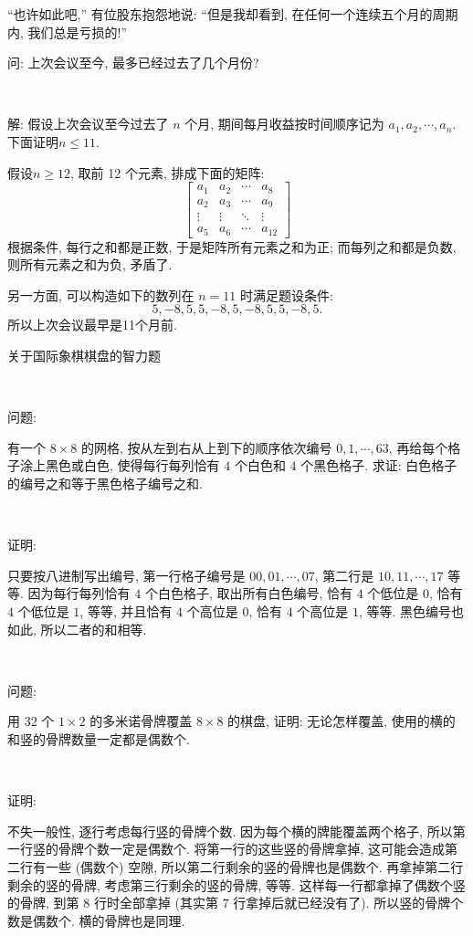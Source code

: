 ``也许如此吧,'' 有位股东抱怨地说: ``但是我却看到, 在任何一个连续五个月的周期内, 我们总是亏损的!''

问: 上次会议至今, 最多已经过去了几个月份?

~

解: 假设上次会议至今过去了 $n$ 个月, 期间每月收益按时间顺序记为 $a_1, a_2, \cdots, a_n$. 下面证明$n \le 11$.

假设$n\ge 12$, 取前 12 个元素, 排成下面的矩阵:
\[
\begin{bmatrix}
a_1 & a_2 & \cdots & a_8 \\
a_2 & a_3 & \cdots & a_9 \\
\vdots & \vdots & \ddots & \vdots \\
a_5 & a_6 & \cdots & a_{12}
\end{bmatrix}
\]
根据条件, 每行之和都是正数, 于是矩阵所有元素之和为正; 而每列之和都是负数, 则所有元素之和为负, 矛盾了.

另一方面, 可以构造如下的数列在 $n = 11$ 时满足题设条件: 
\[ 5, -8, 5, 5, -8, 5, -8, 5, 5, -8, 5 .\]
所以上次会议最早是11个月前.

\newpage
\noindent 关于国际象棋棋盘的智力题

~

\noindent 问题:

有一个 $ 8\times 8$ 的网格, 按从左到右从上到下的顺序依次编号 $0, 1, \cdots, 63 $, 再给每个格子涂上黑色或白色, 使得每行每列恰有 $ 4 $ 个白色和 $ 4 $ 个黑色格子. 求证: 白色格子的编号之和等于黑色格子编号之和.

~

\noindent 证明:

只要按八进制写出编号, 第一行格子编号是 $00, 01, \cdots, 07 $, 第二行是 $ 10, 11, \cdots, 17 $ 等等.
因为每行每列恰有 $ 4 $ 个白色格子, 取出所有白色编号, 恰有 $ 4 $ 个低位是 $ 0 $, 恰有 $ 4 $ 个低位是 $ 1 $, 等等, 并且恰有 $ 4 $ 个高位是 $ 0 $, 恰有 $ 4 $ 个高位是 $ 1 $, 等等. 黑色编号也如此, 所以二者的和相等. 

~

\noindent 问题: 

用 $ 32 $ 个 $ 1\times 2 $ 的多米诺骨牌覆盖 $ 8 \times 8 $ 的棋盘, 证明: 无论怎样覆盖, 使用的横的和竖的骨牌数量一定都是偶数个.

~

\noindent 证明:

不失一般性, 逐行考虑每行竖的骨牌个数. 因为每个横的牌能覆盖两个格子, 所以第一行竖的骨牌个数一定是偶数个. 将第一行的这些竖的骨牌拿掉, 这可能会造成第二行有一些 (偶数个) 空隙, 所以第二行剩余的竖的骨牌也是偶数个. 再拿掉第二行剩余的竖的骨牌, 考虑第三行剩余的竖的骨牌, 等等. 这样每一行都拿掉了偶数个竖的骨牌, 到第 $ 8 $ 行时全部拿掉 (其实第 $ 7 $ 行拿掉后就已经没有了). 所以竖的骨牌个数是偶数个. 横的骨牌也是同理.

